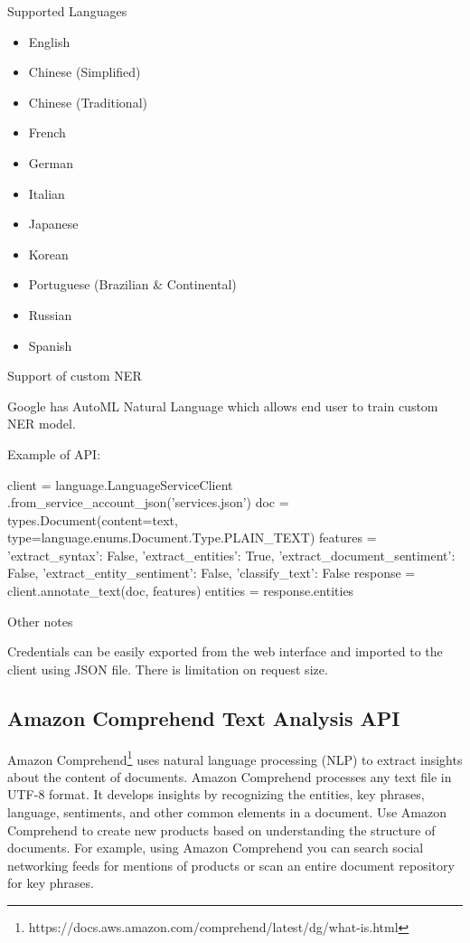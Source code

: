 \documentclass[conference]{IEEEtran}
\begin{document}
Supported Languages

\begin{itemize}
	\item English
	\item Chinese (Simplified)
	\item Chinese (Traditional)
	\item French
	\item German
	\item Italian
	\item Japanese
	\item Korean
	\item Portuguese (Brazilian \& Continental)
	\item Russian
	\item Spanish
\end{itemize}

Support of custom NER

Google has AutoML Natural Language which allows end user to train custom NER model.

Example of API:

\begin{verbatimtab}[4]
client = language.LanguageServiceClient
	.from_service_account_json('services.json')
doc = types.Document(content=text, 
	type=language.enums.Document.Type.PLAIN_TEXT)
features = {'extract_syntax': False, 
	'extract_entities': True, 
	'extract_document_sentiment': False, 
	'extract_entity_sentiment': False,
	'classify_text': False}
response = client.annotate_text(doc, features)
entities = response.entities
\end{verbatimtab}

Other notes

Credentials can be easily exported from the web interface and imported to the client using JSON file. There is limitation on request size. 

\subsection{Amazon Comprehend Text Analysis API}

Amazon Comprehend\footnote{https://docs.aws.amazon.com/comprehend/latest/dg/what-is.html} uses natural language processing (NLP) to extract insights about the content of documents. Amazon Comprehend processes any text file in UTF-8 format. It develops insights by recognizing the entities, key phrases, language, sentiments, and other common elements in a document. Use Amazon Comprehend to create new products based on understanding the structure of documents. For example, using Amazon Comprehend you can search social networking feeds for mentions of products or scan an entire document repository for key phrases.
\end{document}
